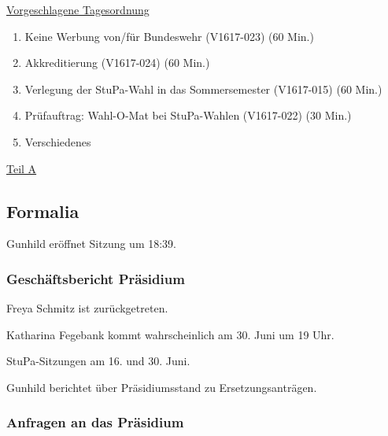 \documentclass[ngerman,headheight=70pt]{scrartcl}
\begin{document}
    \newpage
    \underline{Vorgeschlagene Tagesordnung}
    \begin{enumerate}[label={\textbf{Top \theenumi}},leftmargin=*]
        \item Keine Werbung von/für Bundeswehr (V1617-023) (60 Min.)
        \item Akkreditierung (V1617-024) (60 Min.)
        \item Verlegung der StuPa-Wahl in das Sommersemester (V1617-015) (60 Min.)
        \item Prüfauftrag: Wahl-O-Mat bei StuPa-Wahlen (V1617-022) (30 Min.)
        \item Verschiedenes
    \end{enumerate}

    \newpage


    {\Large \underline{Teil A}}

    \subsection{Formalia}

    Gunhild eröffnet Sitzung um 18:39.

    \subsubsection{Geschäftsbericht Präsidium}

    Freya Schmitz ist zurückgetreten.

    Katharina Fegebank kommt wahrscheinlich am 30. Juni um 19 Uhr.

    StuPa-Sitzungen am 16. und 30. Juni.

    Gunhild berichtet über Präsidiumsstand zu Ersetzungsanträgen.

    \subsubsection{Anfragen an das Präsidium}
\end{document}
